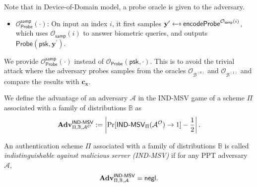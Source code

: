 Note that in Device-of-Domain model, a probe oracle is given to the adversary.

\begin{itemize}

	\item $\mathcal{O}_{\textsf{Probe}}^{\textsf{samp}}(\cdot)$: On input an index $i$, it first samples $\mathbf{y}^\prime \getsdollar \textsf{encodeProbe}^{\mathcal{O}_{\textsf{samp}}(i)}$, which uses $\mathcal{O}_{\textsf{samp}}(i)$ to answer biometric queries, and outputs $\textsf{Probe}(\textsf{psk}, \mathbf{y}^\prime )$. 

\end{itemize}

We provide $\mathcal{O}_{\textsf{Probe}}^{\textsf{samp}}(\cdot)$ instead of $\mathcal{O}_{\textsf{Probe}}(\textsf{psk}, \cdot)$. This is to avoid the trivial attack where the adversary probes samples from the oracles $\mathcal{O}_{\mathcal{B}^{(0)}}$ and $\mathcal{O}_{\mathcal{B}^{(1)}}$ and compare the results with $\mathbf{c_x}$.

We define the advantage of an adversary $\mathcal{A}$ in the \textsf{IND-MSV} game of a scheme $\Pi$ associated with a family of distributions $\mathbb{B}$ as
\[
	\mathbf{Adv}^{\textsf{IND-MSV}}_{\Pi, \mathbb{B}, \mathcal{A}^\mathcal{O}} := \left |\Pr[\textsf{IND-MSV}_{\Pi}(\mathcal{A}^\mathcal{O}) \to 1] - \frac{1}{2} \right|.
\]

An authentication scheme $\Pi$ associated with a family of distributions $\mathbb{B}$ is called \emph{indistinguishable against malicious server (IND-MSV)} if for any PPT adversary $\mathcal{A}$,
\[
	\mathbf{Adv}^{\textsf{IND-MSV}}_{\Pi, \mathbb{B}, \mathcal{A}} = \mathsf{negl}.
\]




% 

\nocite{*}
\printbibliography



